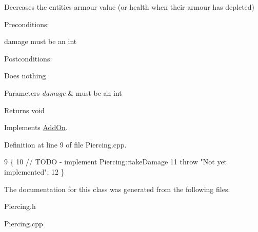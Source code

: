 Decreases the entities\textquotesingle{} armour value (or health when their armour has depleted) 

Preconditions\+:
\begin{DoxyItemize}
\item damage must be an int
\end{DoxyItemize}

Postconditions\+:
\begin{DoxyItemize}
\item Does nothing
\end{DoxyItemize}


\begin{DoxyParams}{Parameters}
{\em damage} & must be an int \\
\hline
\end{DoxyParams}
\begin{DoxyReturn}{Returns}
void 
\end{DoxyReturn}


Implements \hyperlink{classAddOn}{Add\+On}.



Definition at line 9 of file Piercing.\+cpp.


\begin{DoxyCode}
9                                     \{
10     \textcolor{comment}{// TODO - implement Piercing::takeDamage}
11     \textcolor{keywordflow}{throw} \textcolor{stringliteral}{"Not yet implemented"};
12 \}
\end{DoxyCode}


The documentation for this class was generated from the following files\+:\begin{DoxyCompactItemize}
\item 
Piercing.\+h\item 
Piercing.\+cpp\end{DoxyCompactItemize}
